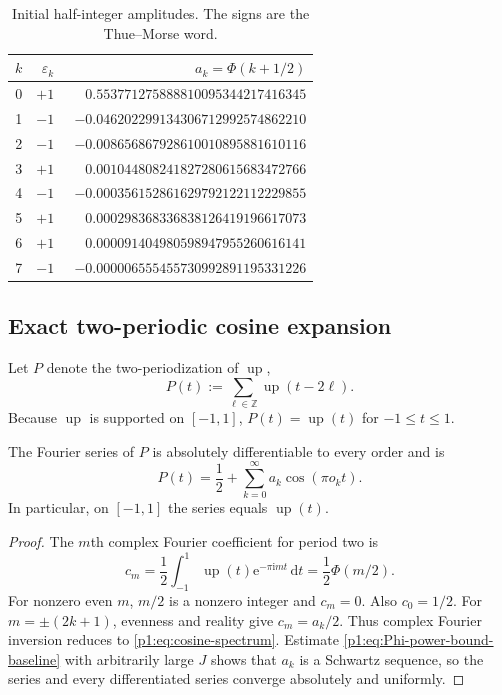 \documentclass[11pt,oneside]{article}
\theoremstyle{definition}
\theoremstyle{remark}
\newcommand{\Z}{\mathbb Z}
\newcommand{\Up}{\operatorname{up}}
\newcommand{\e}{\mathrm e}
\newcommand{\ii}{\mathrm i}
\newcommand{\dd}{\,\mathrm d}
\newcommand{\eps}{\varepsilon}
\newcommand{\PhiU}{\Phi}
\begin{document}
\begin{table}[ht]
\centering\small
\begin{tabular}{@{}r r r@{}}
\toprule
$k$ & $\eps_k$ & $a_k=\PhiU(k+1/2)$ \\
\midrule
0 & $+1$ & $\phantom{-}0.553771275888810095344217416345$ \\
1 & $-1$ & $-0.046202299134306712992574862210$ \\
2 & $-1$ & $-0.008656867928610010895881610116$ \\
3 & $+1$ & $\phantom{-}0.001044808241827280615683472766$ \\
4 & $-1$ & $-0.000356152861629792122112229855$ \\
5 & $+1$ & $\phantom{-}0.000298368336838126419196617073$ \\
6 & $+1$ & $\phantom{-}0.000091404980598947955260616141$ \\
7 & $-1$ & $-0.000006555455730992891195331226$ \\
\bottomrule
\end{tabular}
\caption{Initial half-integer amplitudes.  The signs are the Thue--Morse word.}
\label{p1:tab:first-amplitudes}
\end{table}

\subsection{Exact two-periodic cosine expansion}

Let $P$ denote the two-periodization of $\Up$,
\begin{equation}\label{p1:eq:P-periodization}
 P(t):=\sum_{\ell\in\Z}\Up(t-2\ell).
\end{equation}
Because $\Up$ is supported on $[-1,1]$, $P(t)=\Up(t)$ for $-1\le t\le1$.

\begin{proposition}\label{p1:prop:cosine-spectrum}
The Fourier series of $P$ is absolutely differentiable to every order and is
\begin{equation}\label{p1:eq:cosine-spectrum}
 \boxed{
 P(t)=\frac12+\sum_{k=0}^{\infty}a_k\cos(\pi o_k t).}
\end{equation}
In particular, on $[-1,1]$ the series equals $\Up(t)$.
\end{proposition}

\begin{proof}
The $m$th complex Fourier coefficient for period two is
\[
 c_m=\frac12\int_{-1}^{1}\Up(t)\e^{-\pi\ii mt}\dd t
 =\frac12\PhiU(m/2).
\]
For nonzero even $m$, $m/2$ is a nonzero integer and $c_m=0$.  Also
$c_0=1/2$.  For $m=\pm(2k+1)$, evenness and reality give
$c_m=a_k/2$.  Thus complex Fourier inversion reduces to
\eqref{p1:eq:cosine-spectrum}.  Estimate \eqref{p1:eq:Phi-power-bound-baseline} with
arbitrarily large $J$ shows that $a_k$ is a Schwartz sequence, so the series
and every differentiated series converge absolutely and uniformly.
\end{proof}
\end{document}
